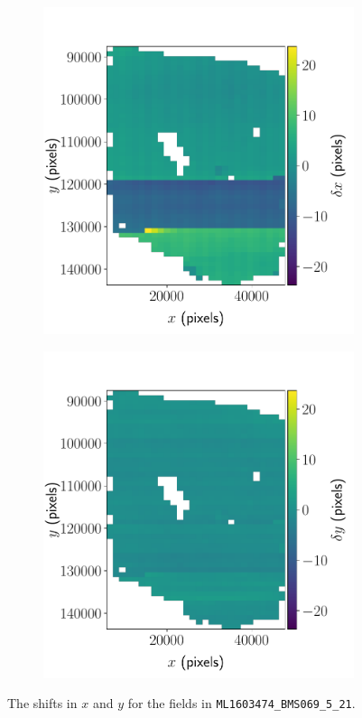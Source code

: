\documentclass{article}
\begin{document}
\begin{figure}[ht]
	\centering
	\begin{subfigure}{0.49\linewidth}
		\includegraphics[width=\linewidth]{2D-shifts-BMS-x}
		\caption{}
		\label{fig:2DBMSx}
	\end{subfigure}
	\begin{subfigure}{0.49\linewidth}
		\includegraphics[width=\linewidth]{2D-shifts-BMS-y}
		\caption{}
		\label{fig:2DBMSy}
	\end{subfigure}
	\caption{The shifts in  $x$ and  $y$ for the fields in \texttt{ML1603474\_BMS069\_5\_21}.}
	\label{fig:2DBMS}
\end{figure}
\end{document}
